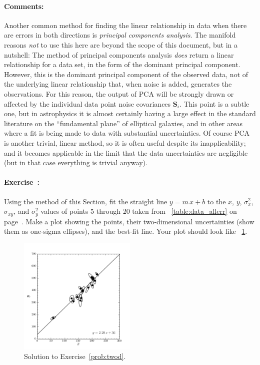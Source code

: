 \documentclass[12pt,twoside]{article}
\newcommand{\documentname}{document}
\newcommand{\sectionname}{Section}
\newcommand{\problemname}{Exercise}
\newcommand{\commentsname}{Comments}
\newcounter{problem}
\newenvironment{problem}{\paragraph{\problemname~\theproblem:}\refstepcounter{problem}}{}
\newenvironment{comments}{\paragraph{\commentsname:}}{}
\newcommand{\mmatrix}[1]{\boldsymbol{#1}}
\newcommand{\mS}{\mmatrix{S}}
\begin{document}
\begin{comments}
Another common method for finding the linear relationship in data when
there are errors in both directions is \emph{principal components
  analysis}.  The manifold reasons \emph{not} to use this here are
beyond the scope of this \documentname, but in a nutshell: The method of
principal components analysis \emph{does} return a linear relationship
for a data set, in the form of the dominant principal component.
However, this is the dominant principal component of the observed
data, not of the underlying linear relationship that, when noise is
added, generates the observations.  For this reason, the output of PCA
will be strongly drawn or affected by the individual data point noise
covariances $\mS_i$.  This point is a subtle one, but in astrophysics
it is almost certainly having a large effect in the standard
literature on the ``fundamental plane'' of elliptical galaxies, and in
other areas where a fit is being made to data with substantial
uncertainties.  Of course PCA is another trivial, linear method, so it
is often useful despite its inapplicability; and it becomes applicable
in the limit that the data uncertainties are negligible (but in that
case everything is trivial anyway).
\end{comments}

\begin{problem}\label{prob:twod}
Using the method of this \sectionname, fit the straight line
$y=m\,x+b$ to the $x$, $y$, $\sigma_x^2$, $\sigma_{xy}$, and
$\sigma_y^2$ values of points 5 through 20 taken from
\tablename~\ref{table:data_allerr} on
page~\pageref{table:data_allerr}.  Make a plot showing the points,
their two-dimensional uncertainties (show them as one-sigma ellipses),
and the best-fit line.  Your plot should look like
\figurename~\ref{fig:twod}.
\end{problem}

\begin{figure}[htb]
\includegraphics[width=0.5\textwidth]{ex12.png}
\caption{Solution to \problemname~\ref{prob:twod}.}\label{fig:twod}
\end{figure}
\end{document}
